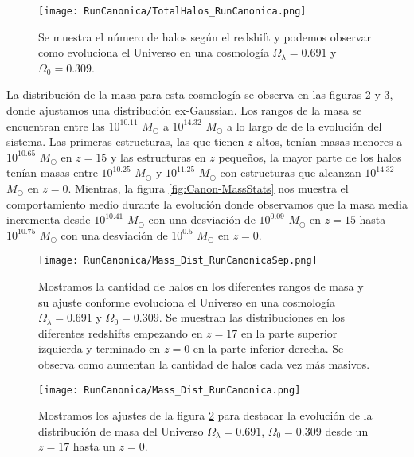 \begin{figure}[H]
    \centering
    \texttt{[image: RunCanonica/TotalHalos\_RunCanonica.png]}
    \caption[Evolución del número de halos en un Universo $\Omega_\lambda = 0.691 $, $\Omega_0 = 0.309$]{\footnotesize Se muestra el número de halos según el redshift y podemos observar como evoluciona el Universo en una cosmología $\Omega_\lambda = 0.691 $ y $\Omega_0 = 0.309$.}
    \label{fig:Canon_TotalHalos}
\end{figure}

La distribución de la masa para esta cosmología se observa en las figuras \ref{fig:Canon-MassDistSep} y \ref{fig:Canon-MassDist}, {\morado donde ajustamos una distribución ex-Gaussian}. Los rangos de la masa se encuentran entre las $10^{10.11}$ $M_\odot$ a $10^{14.32}$ $M_\odot$ a lo largo de de la evolución del sistema. Las primeras estructuras, las que tienen $z$ altos, tenían masas menores a $10^{10.65}$ $M_\odot$ en $z=15$ y las estructuras en $z$ pequeños, la mayor parte de los halos tenían masas entre $10^{10.25}$ $M_\odot$ y $10^{11.25}$ $M_\odot$ con estructuras que alcanzan $10^{14.32}$ $M_\odot$ en $z=0$. Mientras, la figura \ref{fig:Canon-MassStats} nos muestra el comportamiento medio durante la evolución donde observamos que la masa media incrementa desde $10^{10.41}$ $M_\odot$ con una desviación de $10^{0.09}$ $M_\odot$ en $z=15$ hasta $10^{10.75}$ $M_\odot$ con una desviación de $10^{0.5}$ $M_\odot$ en $z=0$.

\begin{figure}[H]
    \centering
    \texttt{[image: RunCanonica/Mass\_Dist\_RunCanonicaSep.png]}
    \caption[Distribución de masa]{\footnotesize Mostramos la cantidad de halos en los diferentes rangos de masa y su ajuste conforme evoluciona el Universo en una cosmología $\Omega_\lambda = 0.691 $ y $\Omega_0 = 0.309$. Se muestran las distribuciones en los diferentes redshifts empezando en $z=17$ en la parte superior izquierda y terminado en $z=0$ en la parte inferior derecha. Se observa como aumentan la cantidad de halos cada vez más masivos.}
    \label{fig:Canon-MassDistSep}
\end{figure}

\begin{figure}[H]
    \centering
    \texttt{[image: RunCanonica/Mass\_Dist\_RunCanonica.png]}
    \caption[Comparación de distribución de masa]{\footnotesize {\morado Mostramos los ajustes de la figura \ref{fig:Canon-MassDistSep} para destacar la evolución de la distribución de masa} del Universo $\Omega_\lambda = 0.691 $, $\Omega_0 = 0.309$ desde un $z=17$ hasta un $z=0$.}
    \label{fig:Canon-MassDist}
\end{figure}

